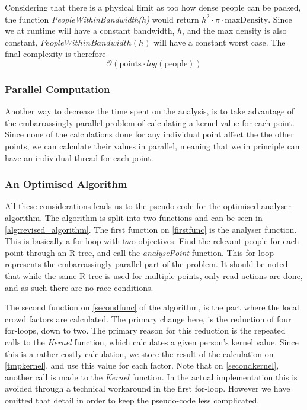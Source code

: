 Considering that there is a physical limit as too how dense people can be packed, the function \emph{PeopleWithinBandwidth(h)} would return $h^2 \cdot \pi \cdot \text{maxDensity}$. Since we at runtime will have a constant bandwidth, $h$, and the max density is also constant, $PeopleWithinBandwidth(h)$ will have a constant worst case. The final complexity is therefore $$\mathcal{O}(\text{points} \cdot log(\text{people}))$$

\subsubsection{Parallel Computation}

Another way to decrease the time spent on the analysis, is to take advantage of the embarrassingly parallel problem of calculating a kernel value for each point. Since none of the calculations done for any individual point affect the the other points, we can calculate their values in parallel, meaning that we in principle can have an individual thread for each point.

\subsubsection{An Optimised Algorithm}
All these considerations leads us to the pseudo-code for the optimised analyser algorithm. The algorithm is split into two functions and can be seen in \cref{alg:revised_algorithm}. The first function on \cref{firstfunc} is the analyser function. This is basically a for-loop with two objectives: Find the relevant people for each point through an R-tree, and call the \emph{analysePoint} function. This for-loop represents the embarrassingly parallel part of the problem. It should be noted that while the same R-tree is used for multiple points, only read actions are done, and as such there are no race conditions.

The second function on \cref{secondfunc} of the algorithm, is the part where the local crowd factors are calculated. The primary change here, is the reduction of four for-loops, down to two. The primary reason for this reduction is the repeated calls to the \emph{Kernel} function, which calculates a given person's kernel value. Since this is a rather costly calculation, we store the result of the calculation on \cref{tmpkernel}, and use this value for each factor. Note that on \cref{secondkernel}, another call is made to the \emph{Kernel} function. In the actual implementation this is avoided through a technical workaround in the first for-loop. However we have omitted that detail in order to keep the pseudo-code less complicated.

